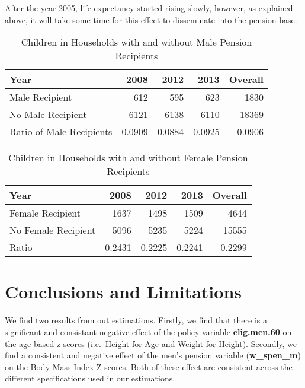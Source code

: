 \begin{refsection}
After the year 2005, life expectancy started rising slowly,
however, as explained above, it will take some time for this effect to disseminate into the pension base.




\begin{table}[ht!]
\centering
\caption{Children in Households with and without Male Pension Recipients}
\label{sa:ta:hmr}
    \begin{tabular}{l|rrrr}
    \hline
    Year              & 2008   & 2012   & 2013   & Overall \\
    \hline
    Male Recipient    & 612    & 595    & 623    & 1830    \\
    No Male Recipient & 6121   & 6138   & 6110   & 18369   \\
    Ratio of Male Recipients & 0.0909 & 0.0884 & 0.0925 & 0.0906  \\
    \end{tabular}
\end{table}

\begin{table}[ht!]
\centering
\caption{Children in Households with and without Female Pension Recipients}
\label{sa:ta:hfr}
    \begin{tabular}{l|rrrr}
    \hline
    Year                & 2008   & 2012   & 2013   & Overall \\
    \hline
    Female Recipient    & 1637   & 1498   & 1509   & 4644    \\
    No Female Recipient & 5096   & 5235   & 5224   & 15555   \\
    Ratio               & 0.2431 & 0.2225 & 0.2241 & 0.2299  \\
    \end{tabular}
\end{table}


\section{Conclusions and Limitations}
We find two results from out estimations.
Firstly, we find that there is a significant and consistant negative effect of the policy variable \textbf{elig.men.60} on the age-based z-scores
(i.e.~Height for Age and Weight for Height).
Secondly, we find a consistent and negative effect of the men's pension variable (\textbf{w\_spen\_m}) on the Body-Mass-Index Z-scores.
Both of these effect are consistent across the different specifications used in our estimations.


\end{refsection}
